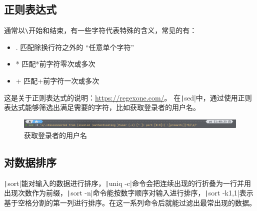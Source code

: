 \documentclass[fontset=ubuntu]{ctexart}
\begin{document}
\begin{sloppypar}
\subsection{正则表达式}
通常以\verb|\|开始和结束，有一些字符代表特殊的含义，常见的有：
\begin{itemize}
    \item . 匹配除换行符之外的 “任意单个字符”
    \item * 匹配*前字符零次或多次
    \item + 匹配+前字符一次或多次
\end{itemize}
这是关于正则表达式的说明：\url{https://regexone.com/}。
在\texttt|sed|中，通过使用正则表达式能够筛选出满足需要的字符，比如获取登录者的用户名。
\begin{figure}[htb]
    \centering
    \includegraphics[width=0.75\linewidth]{sed_1.png}
    \caption{获取登录者的用户名}
    \label{fig:sed_1}
\end{figure}

\subsection{对数据排序}
\texttt|sort|能对输入的数据进行排序，\texttt|uniq -c|命令会把连续出现的行折叠为一行并用出现次数作为前缀，\texttt|sort -n|命令能按数字顺序对输入进行排序，\texttt|sort -k1,1|表示基于空格分割的第一列进行排序。在这一系列命令后就能过滤出最常出现的数据。

\end{sloppypar}
\end{document}
